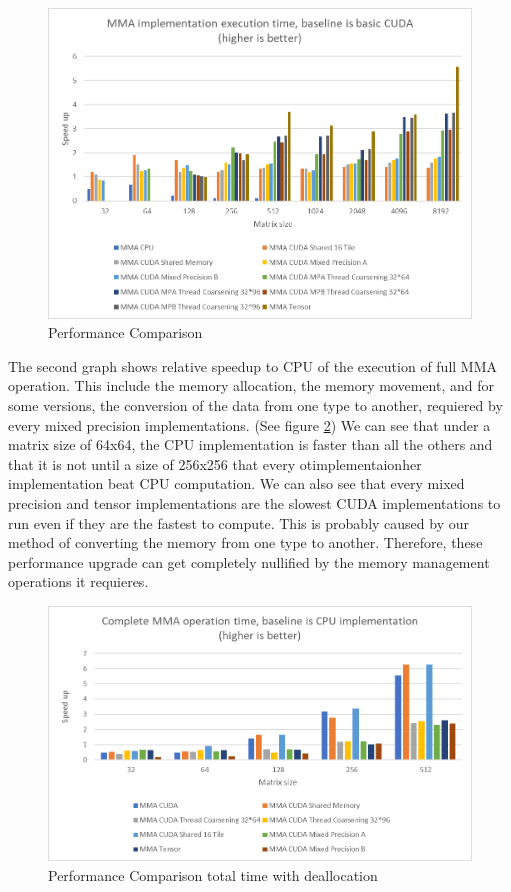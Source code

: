 \documentclass[conference]{IEEEtran}
\begin{document}
  \begin{figure}[h]
    \centering
    \includegraphics[scale=0.5]{figures/relative_speedup_3.png}
    \caption{Performance Comparison}
    \label{fig:performance-comparison}
  \end{figure}

  The second graph shows relative speedup to CPU of the execution of full MMA operation. 
  This include the memory allocation, the memory movement, and for some versions,
  the conversion of the data from one type to another, requiered by every mixed precision
  implementations. (See figure \ref{fig:time-comparison})
  We can see that under a matrix size of 64x64, the CPU implementation is faster than all the others
  and that it is not until a size of 256x256 that every otimplementaionher implementation beat CPU computation.
  We can also see that every mixed precision and tensor implementations are the slowest CUDA implementations
  to run even if they are the fastest to compute. This is probably caused by
  our method of converting the memory from one type to another. Therefore, these performance upgrade
  can get completely nullified by the memory management operations it requieres.


  \begin{figure}[h]
    \centering
    \includegraphics[scale=0.5]{figures/Tot_time_relative_speedup2.png}
    \caption{Performance Comparison total time with deallocation}
    \label{fig:time-comparison}
  \end{figure}
  
\end{document}
